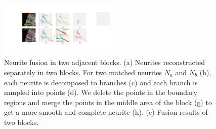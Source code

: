  
 \begin{figure}[t]
 	\centering
 	\includegraphics[width=0.5\textwidth]{./Illustrations/fusion_algorithm.pdf}
 	\caption{Neurite fusion in two adjacent blocks. (a) Neurites reconstructed separately in two blocks. For two matched neurites $N_a$ and $N_b$ (b), each neurite is decomposed to branches (c) and each branch is sampled into points (d). We delete the points in the boundary regions and merge the points in the middle area of the block (g) to get a more smooth and complete neurite (h). (e) Fusion results of two blocks. }
 	\label{fig:fusion_algorithm}
 \end{figure}
 
 


